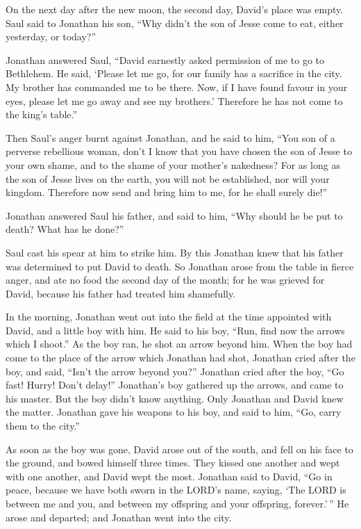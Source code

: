  On the next day after the new moon, the second day,
David's place was empty. Saul said to Jonathan his son, ``Why didn't the
son of Jesse come to eat, either yesterday, or today?''

 Jonathan answered Saul, ``David earnestly asked permission
of me to go to Bethlehem.  He said, `Please let me go, for
our family has a sacrifice in the city. My brother has commanded me to
be there. Now, if I have found favour in your eyes, please let me go
away and see my brothers.' Therefore he has not come to the king's
table.''

 Then Saul's anger burnt against Jonathan, and he said to
him, ``You son of a perverse rebellious woman, don't I know that you
have chosen the son of Jesse to your own shame, and to the shame of your
mother's nakedness?  For as long as the son of Jesse lives
on the earth, you will not be established, nor will your kingdom.
Therefore now send and bring him to me, for he shall surely die!''

 Jonathan answered Saul his father, and said to him, ``Why
should he be put to death? What has he done?''

 Saul cast his spear at him to strike him. By this Jonathan
knew that his father was determined to put David to death. 
So Jonathan arose from the table in fierce anger, and ate no food the
second day of the month; for he was grieved for David, because his
father had treated him shamefully.

 In the morning, Jonathan went out into the field at the
time appointed with David, and a little boy with him.  He
said to his boy, ``Run, find now the arrows which I shoot.'' As the boy
ran, he shot an arrow beyond him.  When the boy had come to
the place of the arrow which Jonathan had shot, Jonathan cried after the
boy, and said, ``Isn't the arrow beyond you?''  Jonathan
cried after the boy, ``Go fast! Hurry! Don't delay!'' Jonathan's boy
gathered up the arrows, and came to his master.  But the
boy didn't know anything. Only Jonathan and David knew the matter.
 Jonathan gave his weapons to his boy, and said to him,
``Go, carry them to the city.''

 As soon as the boy was gone, David arose out of the south,
and fell on his face to the ground, and bowed himself three times. They
kissed one another and wept with one another, and David wept the most.
 Jonathan said to David, ``Go in peace, because we have
both sworn in the LORD's name, saying, `The LORD is between me and you,
and between my offspring and your offspring, forever.'\,'' He arose and
departed; and Jonathan went into the city.

